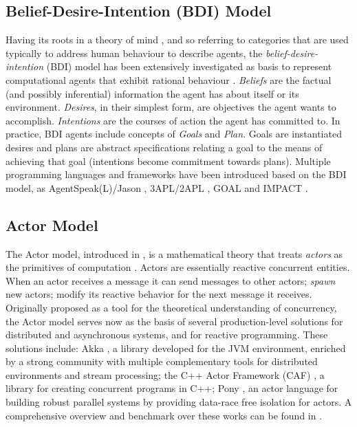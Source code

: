 \subsection{Belief-Desire-Intention (BDI) Model}
Having its roots in a theory of mind \cite{bratman1987intention}, and so referring to categories that are used typically to address human behaviour to describe agents, the \textit{belief-desire-intention} (BDI) model \cite{Rao1995} has been extensively investigated as basis to represent computational agents that exhibit rational behaviour \cite{Herzig2017}. 
\textit{Beliefs} are the factual (and possibly inferential) information the agent has about itself or its environment. \textit{Desires}, in their simplest form, are objectives the agent wants to accomplish. %
\textit{Intentions} are the courses of action the agent has committed to. In practice, BDI agents include concepts of \textit{Goals} and \textit{Plan}. Goals are instantiated desires %
and plans are abstract specifications relating a goal to the means of achieving that goal (intentions become commitment towards plans). Multiple programming languages and frameworks have been introduced based on the BDI model, as AgentSpeak(L)/Jason \cite{RaoAS1996,Bordini2005}, 3APL/2APL \cite{Dastani2APL}, GOAL \cite{Hindriks2009a} and IMPACT \cite{IMPACT}.


\subsection{Actor Model}
The Actor model, introduced in \cite{Hewitt}, is a mathematical theory that treats \textit{actors} as the primitives of computation \cite{hewitt2010actor}. Actors are essentially reactive concurrent entities. %
When an actor receives a message it can %
send messages to other actors; \textit{spawn} new actors; modify its reactive behavior for the next message it receives.
Originally proposed as a tool for the theoretical understanding of concurrency, the Actor model serves now as the basis of several production-level solutions for distributed and asynchronous systems, and for reactive programming. These solutions include: Akka \cite{AKKA}, a library developed for the JVM environment, enriched by a strong community with multiple complementary tools for distributed environments and stream processing; the C++ Actor Framework (CAF) \cite{CAF}, a library %
for creating concurrent programs in C++; Pony \cite{PONY1,PONY2}, an actor language for building robust parallel systems by providing data-race free isolation for actors. A comprehensive overview and benchmark over these works can be found in \cite{RunActor}. 


